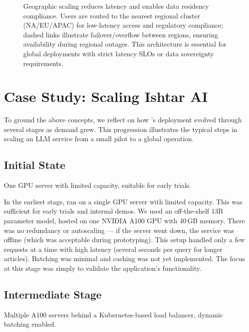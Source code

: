 \begin{figure}[t]
\begin{llmfigbox}
\begin{tikzpicture}
\end{tikzpicture}
\end{llmfigbox}
\caption{Geographic scaling reduces latency and enables data residency compliance. Users are routed to the nearest regional cluster (NA/EU/APAC) for low-latency access and regulatory compliance; dashed links illustrate failover/overflow between regions, ensuring availability during regional outages. This architecture is essential for global deployments with strict latency SLOs or data sovereignty requirements.}
\label{fig:ch06_geo_scaling_inset}
\end{figure}

\section{Case Study: Scaling Ishtar AI}
\label{sec:scaling-ishtar-case-study}
To ground the above concepts, we reflect on how \ishtar{}'s deployment evolved through several stages as demand grew. This progression illustrates the typical steps in scaling an LLM service from a small pilot to a global operation.

\subsection{Initial State}
\label{sec:scaling-ishtar-initial}
One GPU server with limited capacity, suitable for early trials.

In the earliest stage, \ishtar{} ran on a single GPU server with limited capacity. This was sufficient for early trials and internal demos. We used an off-the-shelf 13B parameter model, hosted on one NVIDIA A100 GPU with 40\,GB memory. There was no redundancy or autoscaling --- if the server went down, the service was offline (which was acceptable during prototyping). This setup handled only a few requests at a time with high latency (several seconds per query for longer articles). Batching was minimal and caching was not yet implemented. The focus at this stage was simply to validate the application’s functionality.

\subsection{Intermediate Stage}
\label{sec:scaling-ishtar-intermediate}
Multiple A100 servers behind a Kubernetes-based load balancer, dynamic batching enabled.

